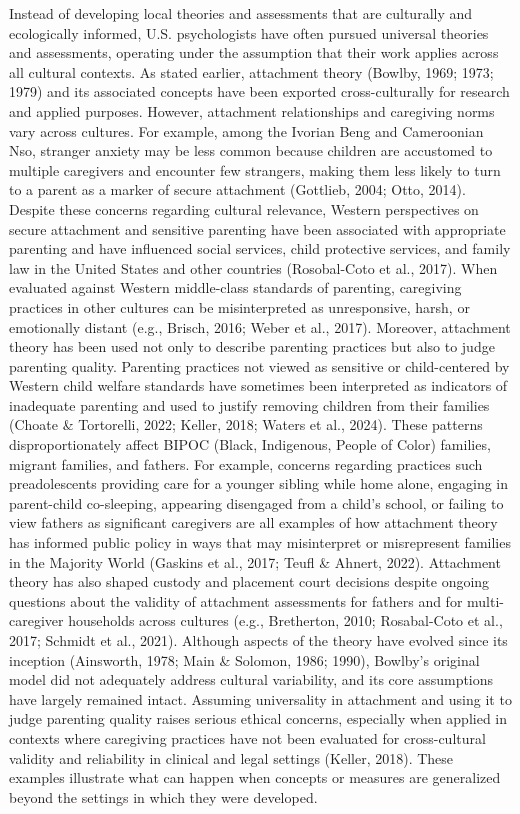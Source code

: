 \documentclass[
  11pt,
]{book}
\begin{document}
Instead of developing local theories and assessments that are culturally and ecologically informed, U.S. psychologists have often pursued universal theories and assessments, operating under the assumption that their work applies across all cultural contexts. As stated earlier, attachment theory (Bowlby, 1969; 1973; 1979) and its associated concepts have been exported cross-culturally for research and applied purposes. However, attachment relationships and caregiving norms vary across cultures. For example, among the Ivorian Beng and Cameroonian Nso, stranger anxiety may be less common because children are accustomed to multiple caregivers and encounter few strangers, making them less likely to turn to a parent as a marker of secure attachment (Gottlieb, 2004; Otto, 2014). Despite these concerns regarding cultural relevance, Western perspectives on secure attachment and sensitive parenting have been associated with appropriate parenting and have influenced social services, child protective services, and family law in the United States and other countries (Rosobal-Coto et al., 2017). When evaluated against Western middle-class standards of parenting, caregiving practices in other cultures can be misinterpreted as unresponsive, harsh, or emotionally distant (e.g., Brisch, 2016; Weber et al., 2017). Moreover, attachment theory has been used not only to describe parenting practices but also to judge parenting quality. Parenting practices not viewed as sensitive or child-centered by Western child welfare standards have sometimes been interpreted as indicators of inadequate parenting and used to justify removing children from their families (Choate \& Tortorelli, 2022; Keller, 2018; Waters et al., 2024). These patterns disproportionately affect BIPOC (Black, Indigenous, People of Color) families, migrant families, and fathers. For example, concerns regarding practices such preadolescents providing care for a younger sibling while home alone, engaging in parent-child co-sleeping, appearing disengaged from a child's school, or failing to view fathers as significant caregivers are all examples of how attachment theory has informed public policy in ways that may misinterpret or misrepresent families in the Majority World (Gaskins et al., 2017; Teufl \& Ahnert, 2022). Attachment theory has also shaped custody and placement court decisions despite ongoing questions about the validity of attachment assessments for fathers and for multi-caregiver households across cultures (e.g., Bretherton, 2010; Rosabal-Coto et al., 2017; Schmidt et al., 2021). Although aspects of the theory have evolved since its inception (Ainsworth, 1978; Main \& Solomon, 1986; 1990), Bowlby's original model did not adequately address cultural variability, and its core assumptions have largely remained intact. Assuming universality in attachment and using it to judge parenting quality raises serious ethical concerns, especially when applied in contexts where caregiving practices have not been evaluated for cross-cultural validity and reliability in clinical and legal settings (Keller, 2018). These examples illustrate what can happen when concepts or measures are generalized beyond the settings in which they were developed.
\end{document}
